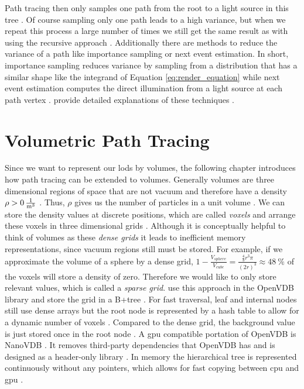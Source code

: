 Path tracing then only samples one path from the root to a light source in this tree \cite{rendering_equation}.
Of course sampling only one path leads to a high variance, but when we repeat this process a large number of times we still get the same result as with using the recursive approach \cite{pbr}.
Additionally there are methods to reduce the variance of a path like importance sampling or next event estimation.
In short, importance sampling reduces variance by sampling from a distribution that has a similar shape like the integrand of Equation \ref{eq:render_equation} while next event estimation computes the direct illumination from a light source at each path vertex \cite{pbr}.
\citeauthor{pbr} provide detailed explanations of these techniques \cite{pbr}.

\section{Volumetric Path Tracing}
Since we want to represent our \acsp{lod} by volumes, the following chapter introduces how path tracing can be extended to volumes.
Generally volumes are three dimensional regions of space that are not vacuum and therefore have a density ${\rho > \SI{0}{\frac{1}{\m^3}}}$ \cite{pbr}.
Thus, $\rho$ gives us the number of particles in a unit volume \cite{novak_overview}.
We can store the density values at discrete positions, which are called \textit{voxels} and arrange these voxels in three dimensional grids \cite{pbr}.
Although it is conceptually helpful to think of volumes as these \textit{dense grids} it leads to inefficient memory representations, since vacuum regions still must be stored.
For example, if we approximate the volume of a sphere by a dense grid, $1 - \frac{V_{sphere}}{V_{cube}} = \frac{\frac{4}{3}r^3\pi}{(2r)^3}\approx \SI{48}{\%}$ of the voxels will store a density of zero.
Therefore we would like to only store relevant values, which is called a \textit{sparse grid}.
\citeauthor{museth_vdb} use this approach in the OpenVDB library and store the grid in a B+tree \cite{museth_vdb}.
For fast traversal, leaf and internal nodes still use dense arrays but the root node is represented by a hash table to allow for a dynamic number of voxels \cite{museth_vdb}.
Compared to the dense grid, the background value is just stored once in the root node \cite{museth_vdb}.
A \ac{gpu} compatible portation of OpenVDB is NanoVDB \cite{museth_nanovdb}.
It removes third-party dependencies that OpenVDB has and is designed as a header-only library \cite{museth_nanovdb}.
In memory the hierarchical tree is represented continuously without any pointers, which allows for fast copying between \ac{cpu} and \ac{gpu} \cite{museth_nanovdb}.

